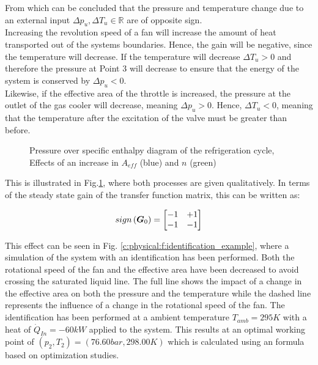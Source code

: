 From which can be concluded that the pressure and temperature change due to an external input $\Delta p_u, \Delta T_u \in \mathbb{R}$ are of opposite sign. \\

Increasing the revolution speed of a fan will increase the amount of heat transported out of the systems boundaries. Hence, the gain will be negative, since the temperature will decrease. If the temperature will decrease $\Delta T_u > 0$ and therefore the pressure at Point 3 will decrease to ensure that the energy of the system is conserved by $\Delta p_u < 0$.\\

Likewise, if the effective area of the throttle is increased, the pressure at the outlet of the gas cooler will decrease, meaning $\Delta p_u > 0$. Hence, $\Delta T_u < 0$, meaning that the temperature after the excitation of the valve must be greater than before.\\

\begin{figure}[H]

\caption{Pressure over specific enthalpy diagram of the refrigeration cycle, Effects of an increase in $A_{eff}$ (blue) and $n$ (green) }
\label{c:physical:f:ph2}
\end{figure}

This is illustrated in Fig.\ref{c:physical:f:ph2}, where both processes are given qualitatively. In terms of the steady state gain of the transfer function matrix, this can be written as:

\begin{align*}
sign\left(\mbox{\boldmath$G$}_0 \right)
= \begin{bmatrix}
-1 & +1 \\
-1 & -1 
\end{bmatrix}
\end{align*}

This effect can be seen in Fig. \ref{c:physical:f:identification_example}, where a simulation of the system with an identification has been performed. Both the rotational speed of the fan and the effective area have been decreased to avoid crossing the saturated liquid line. The full line shows the impact of a change in the effective area on both the pressure and the temperature while the dashed line represents the influence of a change in the rotational speed of the fan. The identification has been performed at a ambient temperature $T_{amb} = 295 K $ with a heat of $\dot{Q}_{In} = -60 kW$ applied to the system. This results at an optimal working point of $\left( p_2, T_2 \right) = \left( 76.60 bar , 298.00 K\right)$ which is calculated using an formula based on optimization studies.

